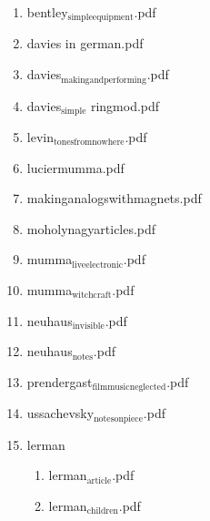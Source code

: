 \documentclass[11pt]{article}
\begin{document}
\begin{enumerate}
\begin{enumerate}
\begin{enumerate}
\item bentley$_{\text{simpleequipment}}$.pdf
\label{sec-1-1-1-1-11-19-20-19-7-6}

\item davies in german.pdf
\label{sec-1-1-1-1-11-19-20-19-7-7}

\item davies$_{\text{makingandperforming}}$.pdf
\label{sec-1-1-1-1-11-19-20-19-7-8}

\item davies$_{\text{simple}}$ ringmod.pdf
\label{sec-1-1-1-1-11-19-20-19-7-9}

\item levin$_{\text{tonesfromnowhere}}$.pdf
\label{sec-1-1-1-1-11-19-20-19-7-10}

\item luciermumma.pdf
\label{sec-1-1-1-1-11-19-20-19-7-11}

\item makinganalogswithmagnets.pdf
\label{sec-1-1-1-1-11-19-20-19-7-12}

\item moholynagyarticles.pdf
\label{sec-1-1-1-1-11-19-20-19-7-13}

\item mumma$_{\text{liveelectronic}}$.pdf
\label{sec-1-1-1-1-11-19-20-19-7-14}

\item mumma$_{\text{witchcraft}}$.pdf
\label{sec-1-1-1-1-11-19-20-19-7-15}

\item neuhaus$_{\text{invisible}}$.pdf
\label{sec-1-1-1-1-11-19-20-19-7-16}

\item neuhaus$_{\text{notes}}$.pdf
\label{sec-1-1-1-1-11-19-20-19-7-17}

\item prendergast$_{\text{filmmusicneglected}}$.pdf
\label{sec-1-1-1-1-11-19-20-19-7-18}

\item ussachevsky$_{\text{notesonpiece}}$.pdf
\label{sec-1-1-1-1-11-19-20-19-7-19}

\item lerman
\label{sec-1-1-1-1-11-19-20-19-7-20}
\begin{enumerate}
\item lerman$_{\text{article}}$.pdf
\label{sec-1-1-1-1-11-19-20-19-7-20-1}

\item lerman$_{\text{children}}$.pdf
\label{sec-1-1-1-1-11-19-20-19-7-20-2}


\end{enumerate}
\end{enumerate}
\end{enumerate}
\end{enumerate}
\end{document}
